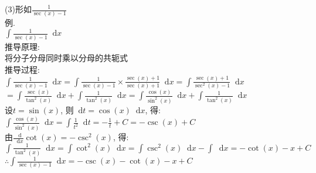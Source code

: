 \documentclass[UTF8, fontset=ubuntu]{ctexart}
\newcommand*{\dif}{\mathop{}\!\mathrm{d}}
\begin{document}
(3)形如$\displaystyle\frac{1}{\sec(x)-1}$\\
例.\\
$\displaystyle\int\frac{1}{\sec(x)-1}\dif x$\\
推导原理:\\
将分子分母同时乘以分母的共轭式\\
推导过程:\\
$\displaystyle\int\frac{1}{\sec(x)-1}\dif x=\int\frac{1}{\sec(x)-1}\times\frac{\sec(x)+1}{\sec(x)+1}\dif x=\int\frac{\sec(x)+1}{\sec^2(x)-1}\dif x$\\
\phantom{$\displaystyle\int\frac{1}{\sec(x)-1}\dif x$}$\displaystyle=\int\frac{\sec(x)}{\tan^2(x)}\dif x+\int\frac{1}{\tan^2(x)}\dif x=\int\frac{\cos(x)}{\sin^2(x)}\dif x+\int\frac{1}{\tan^2(x)}\dif x$\\
设$t=\sin(x)$, 则$\dif t=\cos(x)\dif x$, 得:\\
$\displaystyle\int\frac{\cos(x)}{\sin^2(x)}\dif x=\int\frac{1}{t^2}\dif t=-\frac{1}{t}+C=-\csc(x)+C$\\
由$\displaystyle\frac{\dif}{\dif x}\cot(x)=-\csc^2(x)$, 得:\\
$\displaystyle\int\frac{1}{\tan^2(x)}\dif x=\int\cot^2(x)\dif x=\int\csc^2(x)\dif x-\int\dif x=-\cot(x)-x+C$\\
$\therefore\displaystyle\int\frac{1}{\sec(x)-1}\dif x=-\csc(x)-\cot(x)-x+C$\\
\end{document}
